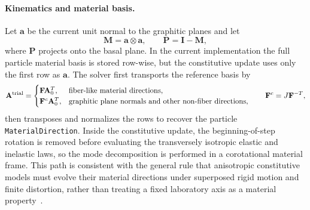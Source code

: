 \paragraph{Kinematics and material basis.}
Let \(\mathbf a\) be the current unit normal to the graphitic planes and let
\begin{equation}
  \mathbf M = \mathbf a\otimes\mathbf a,
  \qquad
  \mathbf P = \mathbf I - \mathbf M,
  \label{eq:graphite-projectors}
\end{equation}
where \(\mathbf P\) projects onto the basal plane.  In the current implementation the full particle material basis is stored row-wise, but the constitutive update uses only the first row as \(\mathbf a\).  The solver first transports the reference basis by
\begin{equation}
  \mathbf A^{\mathrm{trial}} =
  \begin{cases}
    \mathbf F\mathbf A_0^T, & \hbox{fiber-like material directions},\\
    \mathbf F^{c}\mathbf A_0^T, & \hbox{graphitic plane normals and other non-fiber directions},
  \end{cases}
  \qquad
  \mathbf F^{c}=J\mathbf F^{-T},
  \label{eq:graphite-material-direction-update}
\end{equation}
then transposes and normalizes the rows to recover the particle \texttt{MaterialDirection}.  Inside the constitutive update, the beginning-of-step rotation is removed before evaluating the transversely isotropic elastic and inelastic laws, so the mode decomposition is performed in a corotational material frame.  This path is consistent with the general rule that anisotropic constitutive models must evolve their material directions under superposed rigid motion and finite distortion, rather than treating a fixed laboratory axis as a material property~\cite{brannon2017rotation}.

